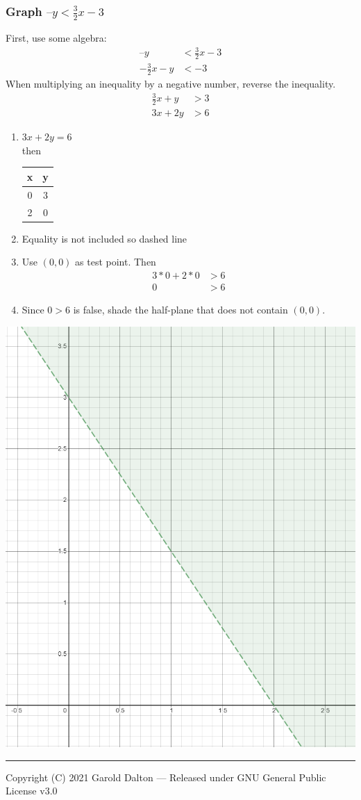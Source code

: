 \documentclass[14pt]{extarticle}
\begin{document}
\subsubsection*{Graph $–y < \frac{3}{2}x -3$}
First, use some algebra:
\begin{align*}
	–y &< \frac{3}{2}x -3 \\
	-\frac{3}{2}x - y &< -3
\end{align*}
When multiplying an inequality by a negative number, reverse the inequality.
\begin{align*}
	\frac{3}{2}x +y &>3 \\
	3x + 2y &>6
\end{align*}
\begin{enumerate}
	\item $3x + 2y =6$ \\ then 
	\begin{tabular}{c|c}
		x & y \\
		\hline
		0 & 3 \\
		2 & 0 \\
	\end{tabular}
	\item Equality is not included so dashed line
	\item Use $(0,0)$ as test point. Then 
	\begin{align*}
		3*0 + 2*0 &>6\\
		0 &> 6
	\end{align*}
	\item Since $0 >6$ is false, shade the half-plane that does not contain $(0,0)$.
\end{enumerate}
\begin{center}\includegraphics[width=0.5\linewidth]{5-1-2}\end{center}

\noindent\rule{\textwidth}{1pt}
{\footnotesize Copyright (C) 2021 Garold Dalton --- Released under GNU General Public License v3.0}


\cleardoublepage
\end{document}
